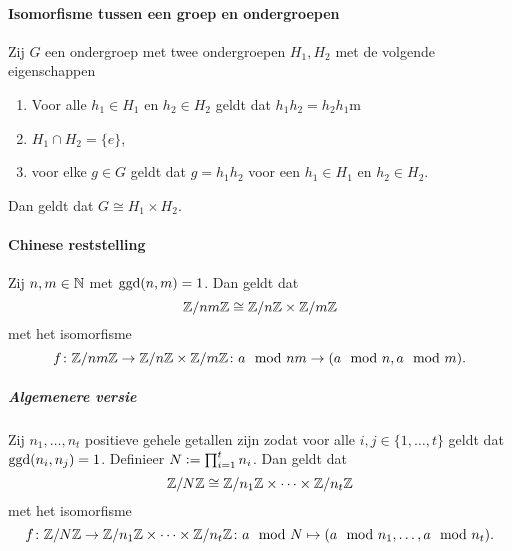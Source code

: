 \paragraph{Isomorfisme tussen een groep en ondergroepen} Zij \(G\) een ondergroep met twee ondergroepen \(H_{1},H_{2}\) met de volgende eigenschappen
\begin{enumerate}
    \item Voor alle \(h_{1}\in H_{1}\) en \(h_{2}\in H_{2}\) geldt dat \(h_{1}h_{2}=h_{2}h_{1}\)m
    \item \(H_{1}\cap H_{2}=\{e\}\),
    \item voor elke \(g\in G\) geldt dat \(g=h_{1}h_{2}\) voor een \(h_{1}\in H_{1}\) en \(h_{2}\in H_{2}\).
\end{enumerate}
Dan geldt dat \(G\cong H_{1}\times H_{2}\).

\paragraph{Chinese reststelling} Zij \(n,m\in\mathbb{N}\) met \(\operatorname{ggd}(n,m)=1\). Dan geldt dat
\[
    \mathbb{Z}/nm\mathbb{Z}\cong\mathbb{Z}/n\mathbb{Z}\times\mathbb{Z}/m\mathbb{Z}
\]
met het isomorfisme
\[
    f\colon\mathbb{Z}/nm\mathbb{Z}\to\mathbb{Z}/n\mathbb{Z}\times\mathbb{Z}/m\mathbb{Z}\colon a\mod nm\to (a\mod n,a\mod m).
\]

\subparagraph{Algemenere versie} Zij \(n_{1},\dots,n_{t}\) positieve    gehele getallen zijn zodat voor alle \(i,j\in\{1,\dots,t\}\) geldt dat \(\operatorname{ggd}(n_{i},n_{j})=1\). Definieer \(N\vcentcolon=\prod_{i=1}^{t}n_{i}\). Dan geldt dat
\[
    \mathbb{Z}/N\mathbb{Z}\cong\mathbb{Z}/n_{1}\mathbb{Z}\times\dots\times\mathbb{Z}/n_{t}\mathbb{Z}
\]
met het isomorfisme
\[
    f\colon\mathbb{Z}/N\mathbb{Z}\to\mathbb{Z}/n_{1}\mathbb{Z}\times\dots\times\mathbb{Z}/n_{t}\mathbb{Z}\colon a\mod N\mapsto (a\mod n_{1},\dots,a\mod n_{t}).
\]